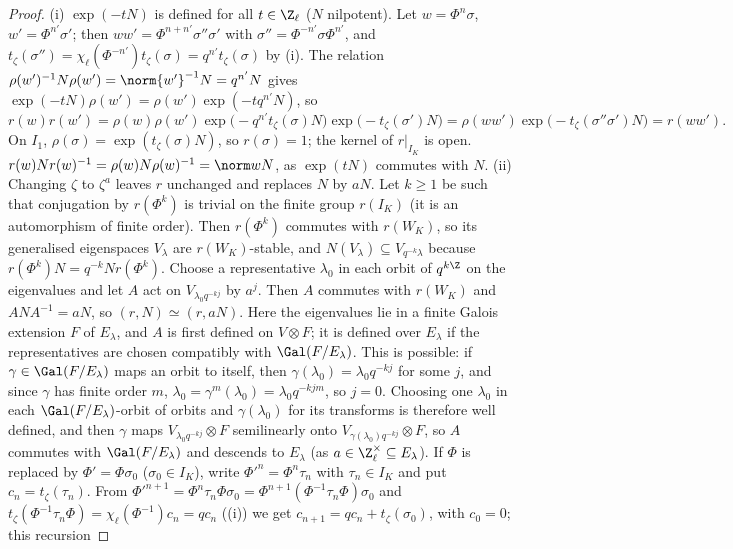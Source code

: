 \begin{proof}
(i) $\exp(-tN)$ is defined for all $t\in\Z_\ell$ ($N$ nilpotent). Let $w=\Phi^n\sigma$, $w'=\Phi^{n'}\sigma'$; then $ww'=\Phi^{n+n'}\sigma''\sigma'$ with
$\sigma''=\Phi^{-n'}\sigma\Phi^{n'}$, and $t_\zeta(\sigma'')=\chi_\ell(\Phi^{-n'})t_\zeta(\sigma)=q^{n'}t_\zeta(\sigma)$ by (i). The relation
$\rho(w')^{-1}N\rho(w')=\norm{w'}^{-1}N=q^{n'}N$ gives $\exp(-tN)\rho(w')=\rho(w')\exp(-tq^{n'}N)$, so
\[
r(w)r(w')=\rho(w)\rho(w')\exp\bigl(-q^{n'}t_\zeta(\sigma)N\bigr)\exp\bigl(-t_\zeta(\sigma')N\bigr)=\rho(ww')\exp\bigl(-t_\zeta(\sigma''\sigma')N\bigr)=r(ww').
\]
On $I_1$, $\rho(\sigma)=\exp(t_\zeta(\sigma)N)$, so $r(\sigma)=1$; the kernel of $r|_{I_K}$ is open. $r(w)Nr(w)^{-1}=\rho(w)N\rho(w)^{-1}=\norm wN$, as $\exp(tN)$ commutes with $N$.
(ii) Changing $\zeta$ to $\zeta^a$ leaves $r$ unchanged and replaces $N$ by $aN$. Let $k\ge1$ be such that conjugation by $r(\Phi^k)$ is trivial on the finite group
$r(I_K)$ (it is an automorphism of finite order). Then $r(\Phi^k)$ commutes with $r(W_K)$, so its generalised eigenspaces $V_\lambda$ are $r(W_K)$-stable, and
$N(V_\lambda)\subseteq V_{q^{-k}\lambda}$ because $r(\Phi^k)N=q^{-k}Nr(\Phi^k)$. Choose a representative $\lambda_0$ in each orbit of $q^{k\Z}$ on the eigenvalues and let $A$ act on
$V_{\lambda_0q^{-kj}}$ by $a^j$. Then $A$ commutes with $r(W_K)$ and $ANA^{-1}=aN$, so $(r,N)\simeq(r,aN)$. Here the eigenvalues lie in a finite Galois
extension $F$ of $E_\lambda$, and $A$ is first defined on $V\otimes F$; it is defined over $E_\lambda$ if the representatives are chosen compatibly with
$\Gal(F/E_\lambda)$. This is possible: if $\gamma\in\Gal(F/E_\lambda)$ maps an orbit to itself, then $\gamma(\lambda_0)=\lambda_0q^{-kj}$ for some $j$, and since
$\gamma$ has finite order $m$, $\lambda_0=\gamma^m(\lambda_0)=\lambda_0q^{-kjm}$, so $j=0$. Choosing one $\lambda_0$ in each $\Gal(F/E_\lambda)$-orbit of orbits and
$\gamma(\lambda_0)$ for its transforms is therefore well defined, and then $\gamma$ maps $V_{\lambda_0q^{-kj}}\otimes F$ semilinearly onto
$V_{\gamma(\lambda_0)q^{-kj}}\otimes F$, so $A$ commutes with $\Gal(F/E_\lambda)$ and descends to $E_\lambda$ (as $a\in\Z_\ell^\times\subseteq E_\lambda$). If $\Phi$ is replaced by $\Phi'=\Phi\sigma_0$ ($\sigma_0\in I_K$), write
$\Phi'^n=\Phi^n\tau_n$ with $\tau_n\in I_K$ and put $c_n=t_\zeta(\tau_n)$. From $\Phi'^{n+1}=\Phi^n\tau_n\Phi\sigma_0=\Phi^{n+1}(\Phi^{-1}\tau_n\Phi)\sigma_0$ and
$t_\zeta(\Phi^{-1}\tau_n\Phi)=\chi_\ell(\Phi^{-1})c_n=qc_n$ ((i)) we get $c_{n+1}=qc_n+t_\zeta(\sigma_0)$, with $c_0=0$; this recursion

\end{proof}
